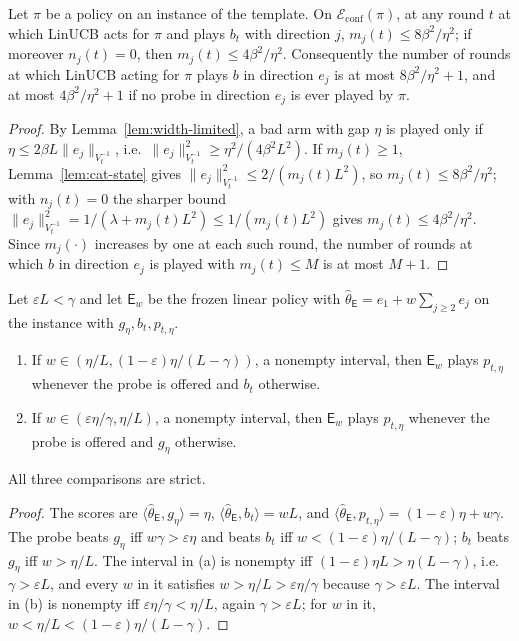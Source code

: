 \documentclass[anon]{alt2027} %
\newcommand{\eps}{\varepsilon}
\newcommand{\Exp}{\mathsf{E}}
\begin{document}
\begin{lemma}
\label{lem:cat-cap}
Let $\pi$ be a policy on an instance of the template. On
$\mathcal E_{\mathrm{conf}}(\pi)$, at any round $t$ at which LinUCB acts for
$\pi$ and plays $b_t$ with direction $j$, $m_j(t)\le8\beta^2/\eta^2$; if
moreover $n_j(t)=0$, then $m_j(t)\le4\beta^2/\eta^2$. Consequently the number
of rounds at which LinUCB acting for $\pi$ plays $b$ in direction $e_j$ is at
most $8\beta^2/\eta^2+1$, and at most $4\beta^2/\eta^2+1$ if no probe in
direction $e_j$ is ever played by $\pi$.
\end{lemma}

\begin{proof}
By Lemma~\ref{lem:width-limited}, a bad arm with gap $\eta$ is played only if
$\eta\le2\beta L\|e_j\|_{V_t^{-1}}$, i.e.\ $\|e_j\|^2_{V_t^{-1}}\ge\eta^2/(4\beta^2L^2)$.
If $m_j(t)\ge1$, Lemma~\ref{lem:cat-state} gives $\|e_j\|^2_{V_t^{-1}}\le2/(m_j(t)L^2)$,
so $m_j(t)\le8\beta^2/\eta^2$; with $n_j(t)=0$ the sharper bound
$\|e_j\|^2_{V_t^{-1}}=1/(\lambda+m_j(t)L^2)\le1/(m_j(t)L^2)$ gives $m_j(t)\le4\beta^2/\eta^2$.
Since $m_j(\cdot)$ increases by one at each such round, the number of rounds
at which $b$ in direction $e_j$ is played with $m_j(t)\le M$ is at most $M+1$.
\end{proof}

\begin{lemma}
\label{lem:expert-routes}
Let $\eps L<\gamma$ and let $\Exp_w$ be the frozen linear policy with
$\widehat\theta_{\Exp}=e_1+w\sum_{j\ge2}e_j$ on the instance with $g_\eta,b_t,p_{t,\eta}$.
\begin{enumerate}[itemsep=1pt,topsep=1pt,leftmargin=*]
\item[(a)] If $w\in(\eta/L,(1-\eps)\eta/(L-\gamma))$, a nonempty interval, then
$\Exp_w$ plays $p_{t,\eta}$ whenever the probe is offered and $b_t$ otherwise.
\item[(b)] If $w\in(\eps\eta/\gamma,\eta/L)$, a nonempty interval, then $\Exp_w$ plays
$p_{t,\eta}$ whenever the probe is offered and $g_\eta$ otherwise.
\end{enumerate}
All three comparisons are strict.
\end{lemma}

\begin{proof}
The scores are $\langle\widehat\theta_{\Exp},g_\eta\rangle=\eta$,
$\langle\widehat\theta_{\Exp},b_t\rangle=wL$, and
$\langle\widehat\theta_{\Exp},p_{t,\eta}\rangle=(1-\eps)\eta+w\gamma$. The probe beats
$g_\eta$ iff $w\gamma>\eps\eta$ and beats $b_t$ iff $w<(1-\eps)\eta/(L-\gamma)$; $b_t$
beats $g_\eta$ iff $w>\eta/L$. The interval in (a) is nonempty iff
$(1-\eps)\eta L>\eta(L-\gamma)$, i.e.\ $\gamma>\eps L$, and every $w$ in it satisfies
$w>\eta/L>\eps\eta/\gamma$ because $\gamma>\eps L$. The interval in (b) is nonempty iff
$\eps\eta/\gamma<\eta/L$, again $\gamma>\eps L$; for $w$ in it, $w<\eta/L<(1-\eps)\eta/(L-\gamma)$.
\end{proof}
\end{document}
